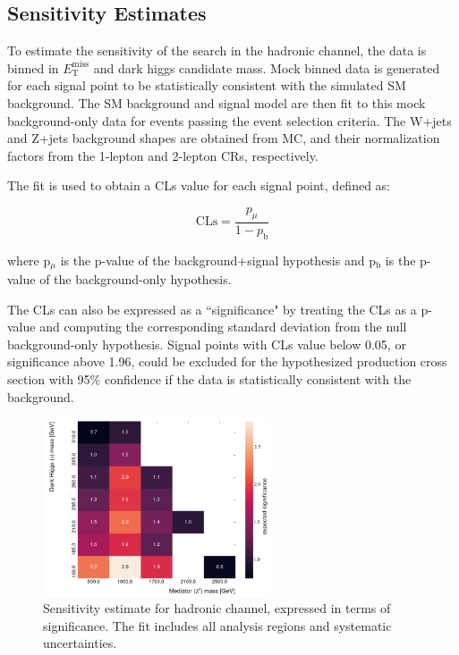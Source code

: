 \documentclass[12pt]{article}
\newcommand*{\met}{\ensuremath{E_\text{T}^\text{miss}} }
\begin{document}
\subsection{Sensitivity Estimates}

To estimate the sensitivity of the search in the hadronic channel, the data is binned in \met and dark higgs candidate mass. Mock binned data is generated for each signal point to be statistically consistent with the simulated SM background. The SM background and signal model are then fit to this mock background-only data for events passing the event selection criteria. The W+jets and Z+jets background shapes are obtained from MC, and their normalization factors from the 1-lepton and 2-lepton CRs, respectively. 

The fit is used to obtain a CLs value \cite{PDG_stats} for each signal point, defined as:

\begin{equation}
\text{CLs} = \frac{p_\mu}{1-p_\text{b}}
\end{equation}

\noindent where p$_\mu$ is the p-value of the background+signal hypothesis and p$_\text{b}$ is the p-value of the background-only hypothesis. 

The CLs can also be expressed as a ``significance" by treating the CLs as a p-value and computing the corresponding standard deviation from the null background-only hypothesis. Signal points with CLs value below 0.05, or significance above 1.96, could be excluded for the hypothesized production cross section with 95\% confidence if the data is statistically consistent with the background. 

\begin{figure}[H]
     \centering
     \includegraphics[width=0.6\textwidth]{figures/had_sensitivity.png}
\caption[]{Sensitivity estimate for hadronic channel, expressed in terms of significance. The fit includes all analysis regions and systematic uncertainties.}
\label{fig:sensitivity}
\end{figure}
\end{document}
